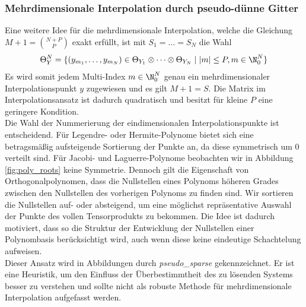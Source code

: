 \subsubsection*{Mehrdimensionale Interpolation durch pseudo-dünne Gitter}
Eine weitere Idee für die mehrdimensionale Interpolation, welche die Gleichung $M+1=\binom{N+P}{P}$ exakt erfüllt, ist mit $S_1=\dots=S_N$ die Wahl
\[\Theta_Y^N=\lbrace (y_{m_1},\dots,y_{m_N})\in \Theta_{Y_1}\otimes \dots \otimes \Theta_{Y_N} \mid |m|\le P,m\in\N_0^N \rbrace \]
Es wird somit jedem Multi-Index $m\in\N_0^N$ genau ein mehrdimensionaler Interpolationspunkt $y$ zugewiesen und es gilt $M+1=S$. Die Matrix im Interpolationsansatz ist dadurch quadratisch und besitzt für kleine $P$ eine geringere Kondition.\\[0.1cm]
Die Wahl der Nummerierung der eindimensionalen Interpolationspunkte ist entscheidend. Für Legendre- oder Hermite-Polynome bietet sich eine betragsmäßig aufsteigende Sortierung der Punkte an, da diese symmetrisch um $0$ verteilt sind. Für Jacobi- und Laguerre-Polynome beobachten wir in Abbildung \ref{fig:poly_roots} keine Symmetrie. Dennoch gilt die Eigenschaft von Orthogonalpolynomen, dass die Nullstellen eines Polynoms höheren Grades zwischen den Nullstellen des vorherigen Polynoms zu finden sind. Wir sortieren die Nullstellen auf- oder absteigend, um eine möglichst repräsentative Auswahl der Punkte des vollen Tensorprodukts zu bekommen. Die Idee ist dadurch motiviert, dass so die Struktur der Entwicklung der Nullstellen einer Polynombasis berücksichtigt wird, auch wenn diese keine eindeutige Schachtelung aufweisen.\\
Dieser Ansatz wird in Abbildungen durch \textit{pseudo\_sparse} gekennzeichnet. Er ist eine Heuristik, um den Einfluss der Überbestimmtheit des zu lösenden Systems besser zu verstehen und sollte nicht als robuste Methode für mehrdimensionale Interpolation aufgefasst werden.\\
